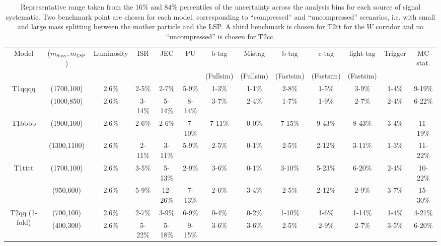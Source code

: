 \begin{landscape}
\begin{table}[h!]
    \scriptsize
    \caption{
        Representative range taken from the $16\%$ and $84\%$ percentiles of the
        uncertainty across the analysis bins for each source of signal
        systematic. Two benchmark point are chosen for each model, corresponding
        to ``compressed'' and ``uncompressed'' scenarios, i.e. with small and
        large mass splitting between the mother particle and the LSP. A third
        benchmark is chosen for T2tt for the $W$ corridor and no
        ``uncompressed'' is chosen for T2cc.
    }
    \label{tab:sig-systematics}
    \centering
    \begin{tabular}{ ccccccccccccc }
        \hline \hline
        Model & ($m_{\mathrm{Susy}},m_{\mathrm{LSP}}$) & Luminosity & ISR & JEC & PU & b-tag & Mistag & b-tag & c-tag & light-tag & Trigger & MC stat. \\
        & & & & & & (Fullsim) & (Fullsim) & (Fastsim) & (Fastsim) & (Fastsim) & & \\
        \hline
        \multirow{2}{*}{T1qqqq}
            & (1700,100) & 2.6\% & 2-5\% & 2-7\% & 5-9\% & 1-3\% & 1-1\% & 2-8\% & 1-5\% & 3-9\% & 1-4\% & 9-19\% \\
            & (1000,850) & 2.6\% & 3-14\% & 5-14\% & 8-14\% & 3-7\% & 2-4\% & 1-7\% & 1-9\% & 2-7\% & 2-4\% & 6-22\% \\
        \hline
        \multirow{2}{*}{T1bbbb}
            & (1900,100)  & 2.6\% & 2-6\% & 2-6\% & 7-10\% & 7-11\% & 0-0\% & 7-15\% & 9-43\% & 8-43\% & 3-4\% & 11-19\% \\
            & (1300,1100) & 2.6\% & 2-11\% & 3-11\% & 5-9\% & 2-5\% & 0-1\% & 2-5\% & 2-12\% & 3-11\% & 1-3\% & 11-22\% \\
        \hline
        \multirow{2}{*}{T1tttt}
            & (1700,100) & 2.6\% & 3-5\% & 5-13\% & 2-9\% & 3-6\% & 0-1\% & 3-10\% & 5-23\% & 6-20\% & 2-4\% & 10-22\% \\
            & (950,600)  & 2.6\% & 5-9\% & 12-26\% & 7-13\% & 2-6\% & 3-4\% & 2-5\% & 2-12\% & 2-9\% & 3-7\% & 15-30\% \\
        \hline
        \multirow{2}{*}{T2qq (1-fold)}
            & (700,100) & 2.6\% & 2-7\% & 3-9\% & 6-9\% & 0-4\% & 0-2\% & 1-10\% & 1-6\% & 1-14\% & 1-4\% & 4-21\% \\
            & (400,300) & 2.6\% & 5-22\% & 5-18\% & 9-15\% & 3-6\% & 3-6\% & 2-5\% & 2-9\% & 2-7\% & 3-5\% & 6-20\% \\
        \hline

\end{tabular}
\end{table}
\end{landscape}
